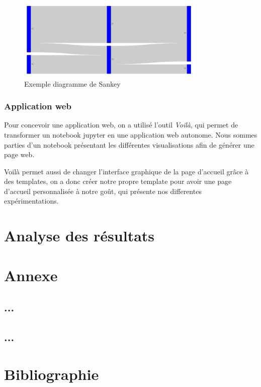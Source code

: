 \documentclass[oneside,13pt,a4paper]{report}
\begin{document}
\begin{figure}[!h]
	\center
	\includegraphics[width=0.8\textwidth]{img/sankey.png}
	\caption{Exemple diagramme de Sankey}
\end{figure}

\subsection{Application web}
Pour concevoir une application web, on a utilisé l'outil \textit{Voilà}, qui permet de transformer un notebook jupyter en une application web autonome. Nous sommes parties d'un notebook présentant les différentes visualisations afin de générer une page web.




Voilà permet aussi de changer l'interface graphique de la page d'accueil grâce à des templates, on a donc créer notre propre template pour avoir une page d'accueil personnalisée à notre goût, qui présente nos differentes expérimentations.



\chapter{Analyse des résultats}


\appendix
\chapter{Annexe}

\section{...}

\section{...}

\chapter{Bibliographie}
\end{document}
